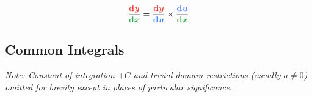 \begin{multicols}{2}
{        
        \begin{equation*}
            \frac{\memphR{\diff{y}}}{\memphG{\diff{x}}}
                = \frac{\memphR{\diff{y}}}{\memphB{\diff{u}}} \times \frac{\memphB{\diff{u}}}{\memphG{\diff{x}}}
        \end{equation*}

    }


    \MulticolsBreak

    \MulticolsPhantomPlaceholder

\end{multicols}



\newpage
\subsection{Common Integrals}%
\label{sub:common-integrals}

{\color{extranotecolor} \textit{Note: Constant of integration $+C$ and trivial domain restrictions (usually $a \ne 0$) omitted for brevity except in places of particular significance.} }

\vspace*{-\parskip} 
\vspace*{-\abovedisplayskip}

